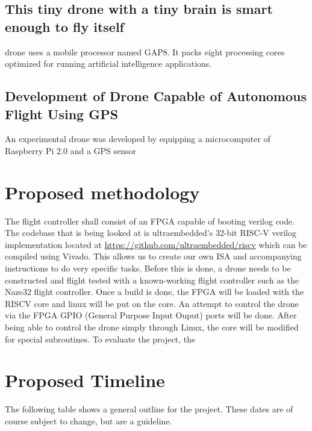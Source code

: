 \documentclass[12pt]{article}
\begin{document}
\subsection{This tiny drone with a tiny brain is smart enough to fly itself}
drone uses a mobile processor named GAP8. It packs eight processing cores optimized for running artificial intelligence applications.

\subsection{Development of Drone Capable of Autonomous Flight Using GPS}
An experimental drone was developed by equipping a
microcomputer of Raspberry Pi 2.0  and a GPS
sensor



\section{Proposed methodology}
The flight controller shall consist of an FPGA capable of booting verilog code. The codebase that is being looked at is ultraembedded's 32-bit RISC-V verilog implementation located at  \url{https://github.com/ultraembedded/riscv} which can be compiled using Vivado. This allows us to create our own ISA and accompanying instructions to do very specific tasks. Before this is done, a drone needs to be constructed and flight tested with a known-working flight controller such as the Naze32 flight controller. Once a build is done, the FPGA will be loaded with the RISCV core and linux will be put on the core. An attempt to control the drone via the FPGA GPIO (General Purpose Input Ouput) ports will be done. After being able to control the drone simply through Linux, the core will be modified for special subroutines. To evaluate the project, the 


\section{Proposed Timeline}
\iffalse
Proposed timelines. Provide a chart or table with the proposed timeline for work broken up
among the group members.
\fi

The following table shows a general outline for the project. These dates are of course subject to change, but are a guideline.
\end{document}
